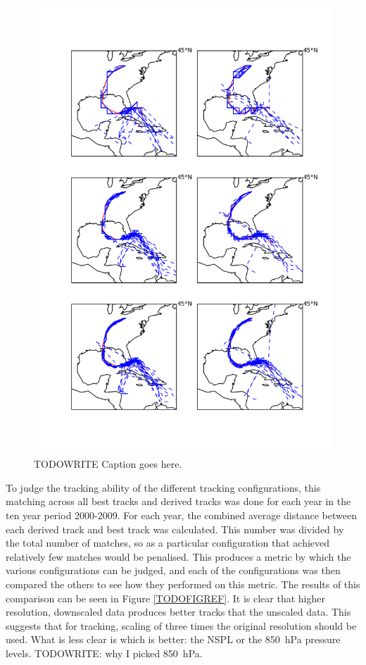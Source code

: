 \documentclass[pdftex,12pt,a4paper]{report}
\begin{document}
\begin{figure}[hbp]
    \centering
    \includegraphics[width=\linewidth]{figures/katrina_six_tracking_configs}
    \caption{TODOWRITE Caption goes here.}
    \label{fig:katrina_six_tracking_configs}
\end{figure}

To judge the tracking ability of the different tracking configurations, this matching across all
best tracks and derived tracks was done for each year in the ten year period 2000-2009.
For each year, the combined average distance between each derived track and best track was
calculated. This number was divided by the total number of matches, so as a particular configuration
that achieved relatively few matches would be penalised. This produces a metric by which the various
configurations can be judged, and each of the configurations was then compared the others to see how
they performed on this metric. The results of this comparison can be seen in Figure
\ref{TODOFIGREF}. It is clear that higher resolution, downscaled data produces better tracks that
the unscaled data. This suggests that for tracking, scaling of three times the original resolution
should be used. What is less clear is which is better: the NSPL or the \SI{850}{hPa}
pressure levels. TODOWRITE: why I picked \SI{850}{hPa}.
\end{document}
